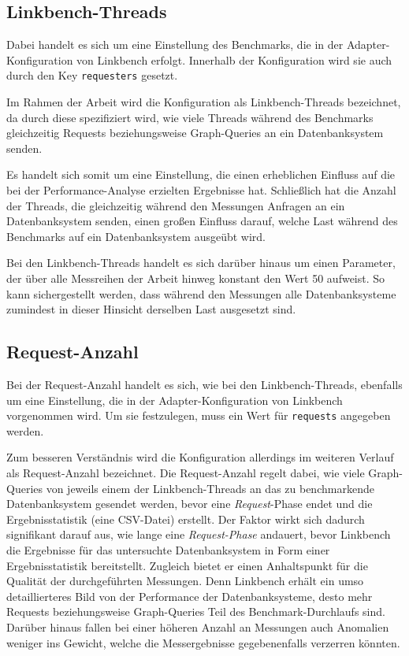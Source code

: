 \subsection{Linkbench-Threads}
\label{analyse:linkbench:threads}
Dabei handelt es sich um eine Einstellung des Benchmarks, die in der Adapter-Konfiguration von Linkbench erfolgt. Innerhalb der Konfiguration wird sie auch durch den Key \texttt{requesters} gesetzt. 

Im Rahmen der Arbeit wird die Konfiguration als Linkbench-Threads bezeichnet, da durch diese spezifiziert wird, wie viele Threads während des Benchmarks gleichzeitig Requests beziehungsweise Graph-Queries an ein Datenbanksystem senden.

Es handelt sich somit um eine Einstellung, die einen erheblichen Einfluss auf die bei der Performance-Analyse erzielten Ergebnisse hat. Schließlich hat die Anzahl der Threads, die gleichzeitig während den Messungen Anfragen an ein Datenbanksystem senden, einen großen Einfluss darauf, welche Last während des Benchmarks auf ein Datenbanksystem ausgeübt wird. 

Bei den Linkbench-Threads handelt es sich darüber hinaus um einen Parameter, der über alle Messreihen der Arbeit hinweg konstant den Wert 50 aufweist. So kann sichergestellt werden, dass während den Messungen alle Datenbanksysteme zumindest in dieser Hinsicht derselben Last ausgesetzt sind. 

\subsection{Request-Anzahl}
\label{analyse:request_anzahl}
Bei der Request-Anzahl handelt es sich, wie bei den Linkbench-Threads, ebenfalls um eine Einstellung, die in der Adapter-Konfiguration von Linkbench vorgenommen wird. Um sie festzulegen, muss ein Wert für \texttt{requests} angegeben werden. 

Zum besseren Verständnis wird die Konfiguration allerdings im weiteren Verlauf als Request-Anzahl bezeichnet. Die Request-Anzahl regelt dabei, wie viele Graph-Queries von jeweils einem der Linkbench-Threads an das zu benchmarkende Datenbanksystem gesendet werden, bevor eine \textit{Request}-Phase endet und die Ergebnisstatistik (eine CSV-Datei) erstellt. Der Faktor wirkt sich dadurch signifikant darauf aus, wie lange eine \textit{Request-Phase} andauert, bevor Linkbench die Ergebnisse für das untersuchte Datenbanksystem in Form einer Ergebnisstatistik bereitstellt. Zugleich bietet er einen Anhaltspunkt für die Qualität der durchgeführten Messungen. Denn Linkbench erhält ein umso detaillierteres Bild von der Performance der Datenbanksysteme, desto mehr Requests beziehungsweise Graph-Queries Teil des Benchmark-Durchlaufs sind. Darüber hinaus fallen bei einer höheren Anzahl an Messungen auch Anomalien weniger ins Gewicht, welche die Messergebnisse gegebenenfalls verzerren könnten.

